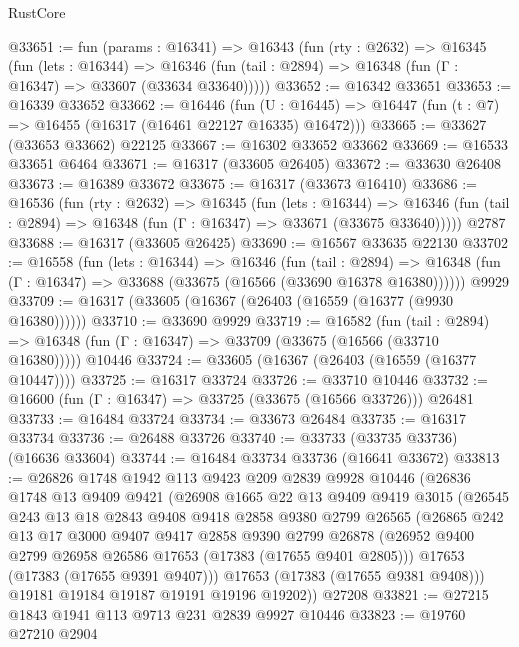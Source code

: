 \begin{lexlean}{RustCore}
\begin{coremodule}
@33651 := fun (params : @16341) =>
  @16343
    (fun (rty : @2632) =>
    @16345
      (fun (lets : @16344) =>
      @16346 (fun (tail : @2894) => @16348 (fun (Γ : @16347) => @33607 (@33634 @33640)))))
@33652 := @16342 @33651
@33653 := @16339 @33652
@33662 := @16446
    (fun (U : @16445) => @16447 (fun (t : @7) => @16455 (@16317 (@16461 @22127 @16335) @16472)))
@33665 := @33627 (@33653 @33662) @22125
@33667 := @16302 @33652 @33662
@33669 := @16533 @33651 @6464
@33671 := @16317 (@33605 @26405)
@33672 := @33630 @26408
@33673 := @16389 @33672
@33675 := @16317 (@33673 @16410)
@33686 := @16536
    (fun (rty : @2632) =>
    @16345
      (fun (lets : @16344) =>
      @16346 (fun (tail : @2894) => @16348 (fun (Γ : @16347) => @33671 (@33675 @33640)))))
    @2787
@33688 := @16317 (@33605 @26425)
@33690 := @16567 @33635 @22130
@33702 := @16558
    (fun (lets : @16344) =>
    @16346
      (fun (tail : @2894) =>
      @16348 (fun (Γ : @16347) => @33688 (@33675 (@16566 (@33690 @16378 @16380))))))
    @9929
@33709 := @16317 (@33605 (@16367 (@26403 (@16559 (@16377 (@9930 @16380))))))
@33710 := @33690 @9929
@33719 := @16582
    (fun (tail : @2894) => @16348 (fun (Γ : @16347) => @33709 (@33675 (@16566 (@33710 @16380)))))
    @10446
@33724 := @33605 (@16367 (@26403 (@16559 (@16377 @10447))))
@33725 := @16317 @33724
@33726 := @33710 @10446
@33732 := @16600 (fun (Γ : @16347) => @33725 (@33675 (@16566 @33726))) @26481
@33733 := @16484 @33724
@33734 := @33673 @26484
@33735 := @16317 @33734
@33736 := @26488 @33726
@33740 := @33733 (@33735 @33736) (@16636 @33604)
@33744 := @16484 @33734 @33736 (@16641 @33672)
@33813 := @26826
    @1748
    @1942
    @113
    @9423
    @209
    @2839
    @9928
    @10446
    (@26836
      @1748
      @13
      @9409
      @9421
      (@26908
        @1665
        @22
        @13
        @9409
        @9419
        @3015
        (@26545
          @243
          @13
          @18
          @2843
          @9408
          @9418
          @2858
          @9380
          @2799
          @26565
          (@26865
            @242
            @13
            @17
            @3000
            @9407
            @9417
            @2858
            @9390
            @2799
            @26878
            (@26952 @9400 @2799 @26958 @26586 @17653 (@17383 (@17655 @9401 @2805)))
            @17653
            (@17383 (@17655 @9391 @9407)))
          @17653
          (@17383 (@17655 @9381 @9408)))
        @19181
        @19184
        @19187
        @19191
        @19196
        @19202))
    @27208
@33821 := @27215 @1843 @1941 @113 @9713 @231 @2839 @9927 @10446
@33823 := @19760 @27210 @2904

\end{coremodule}
\end{lexlean}
